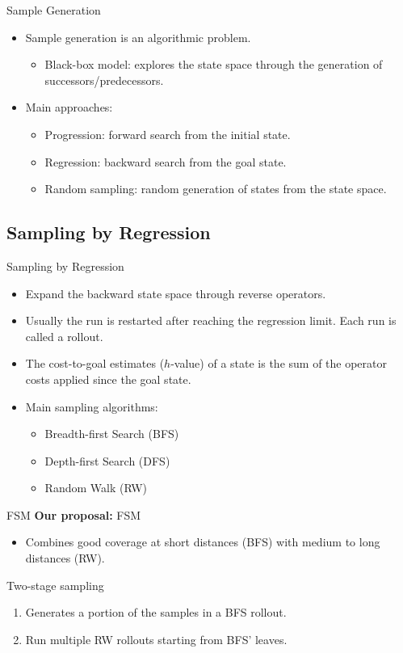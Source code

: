 \documentclass[10pt]{beamer}
\providecommand{\h}{\ensuremath{h}\xspace}
\begin{document}
\begin{frame}{Sample Generation}
\begin{itemize}
    \item Sample generation is an algorithmic problem.
    \begin{itemize}
        \item Black-box model: explores the state space through the generation of successors/predecessors.
    \end{itemize}
    \bigskip
    \item Main approaches:
    \begin{itemize}
        \item Progression: forward search from the initial state.
        \item Regression: backward search from the goal state.
        \item Random sampling: random generation of states from the state space.
    \end{itemize}
\end{itemize}
\end{frame}

\subsection{Sampling by Regression}

\begin{frame}{Sampling by Regression}
\begin{itemize}
    \item Expand the backward state space through reverse operators.
    \item Usually the run is restarted after reaching the \alert{regression limit}. Each run is called a \alert{rollout}.
    \item The cost-to-goal estimates (\h-value) of a state is the sum of the operator costs applied since the goal state.
    \bigskip
    \item Main sampling algorithms:
    \begin{itemize}
        \item Breadth-first Search (BFS)
        \item Depth-first Search (DFS)
        \item Random Walk (RW)
    \end{itemize}
\end{itemize}
\end{frame}

\begin{frame}{FSM}
\textbf{Our proposal:} FSM
\begin{itemize}
    \item Combines good coverage at short distances (BFS) with medium to long distances (RW).
\end{itemize}
\bigskip
Two-stage sampling
\begin{enumerate}
    \item Generates a portion of the samples in a BFS rollout.
    \item Run multiple RW rollouts starting from BFS' leaves.
\end{enumerate}
\end{frame}
\end{document}
